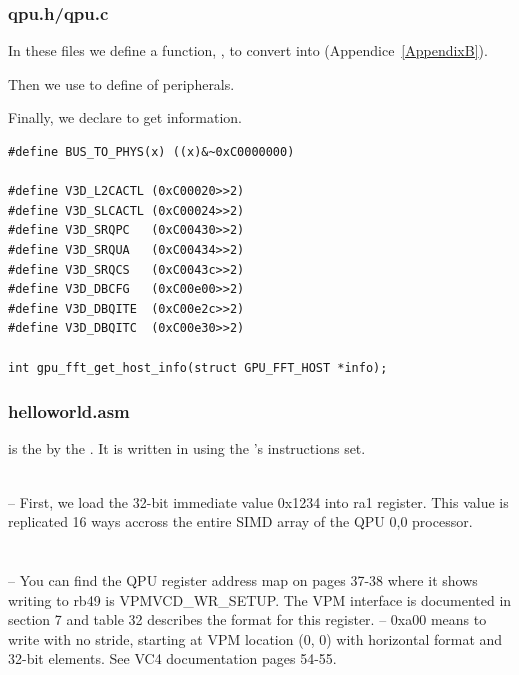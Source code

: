 \subsubsection{qpu.h/qpu.c}

In these files we define a  function, , to convert  into  (Appendice~\ref{AppendixB}).

Then we use  to define  of \vc{} peripherals.

Finally, we declare  to get \rasp{} information.


\begin{lstlisting}
#define BUS_TO_PHYS(x) ((x)&~0xC0000000)

#define V3D_L2CACTL (0xC00020>>2)
#define V3D_SLCACTL (0xC00024>>2)
#define V3D_SRQPC   (0xC00430>>2)
#define V3D_SRQUA   (0xC00434>>2)
#define V3D_SRQCS   (0xC0043c>>2)
#define V3D_DBCFG   (0xC00e00>>2)
#define V3D_DBQITE  (0xC00e2c>>2)
#define V3D_DBQITC  (0xC00e30>>2)

int gpu_fft_get_host_info(struct GPU_FFT_HOST *info);
\end{lstlisting}


\subsubsection{helloworld.asm}

 is the  by the \vc. It is written in  using the \vc{}'s instructions set.

\\
-- First, we load the 32-bit immediate value 0x1234 into ra1 register. This value is replicated 16 ways accross the entire SIMD array of the QPU 0,0 processor.\\~\\

\\
-- You can find the QPU register address map on pages 37-38 where it shows writing to rb49 is VPMVCD\_WR\_SETUP. The VPM interface is documented in section 7 and table 32 describes the format for this register.
-- 0xa00 means to write with no stride, starting at VPM location (0, 0) with horizontal format and 32-bit elements. See VC4 documentation pages 54-55.\\~\\


